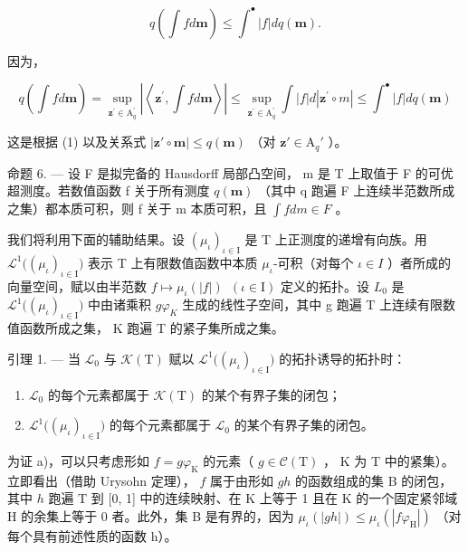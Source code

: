 \[
q \left(\int f d \mathbf {m}\right) \leqslant \int^ {\bullet} | f | d q (\mathbf {m}).
\]

因为，

\[
q \left(\int f d \mathbf {m}\right) = \sup _ {\mathbf {z} ^ {\prime} \in \mathrm{A} _ {q} ^ {\prime}} \left| \left\langle \mathbf {z} ^ {\prime}, \int f d \mathbf {m} \right\rangle \right| \leqslant \sup _ {\mathbf {z} ^ {\prime} \in \mathrm{A} _ {q} ^ {\prime}} \int | f | d | \mathbf {z} ^ {\prime} \circ m | \leqslant \int^ {\bullet} | f | d q (\mathbf {m})
\]

这是根据 (1) 以及关系式 \(|\mathbf{z}' \circ \mathbf{m}| \leqslant q(\mathbf{m})\) （对 \(\mathbf{z}' \in \mathrm{A}_q'\) ）。

命题 6. --- 设 F 是拟完备的 Hausdorff 局部凸空间， m 是 T 上取值于 F 的可优超测度。若数值函数 f 关于所有测度 \(q(\mathbf{m})\) （其中 q 跑遍 F 上连续半范数所成之集）都本质可积，则 f 关于 m 本质可积，且 \(\int f dm \in F\) 。

我们将利用下面的辅助结果。设 \((\mu_{\iota})_{\iota\in\mathrm{I}}\) 是 T 上正测度的递增有向族。用 \(\mathcal{L}^{1}\big((\mu_{\iota})_{\iota\in\mathrm{I}}\big)\) 表示 T 上有限数值函数中本质 \(\mu_{\iota}\)-可积（对每个 \(\iota\in I\) ）者所成的向量空间，赋以由半范数 \(f\mapsto\mu_{\iota}(|f|)\;\ (\iota\in\mathrm{I})\) 定义的拓扑。设 \(L_{0}\) 是 \(\mathcal{L}^{1}\big((\mu_{\iota})_{\iota\in\mathrm{I}}\big)\) 中由诸乘积 \(g\varphi_{K}\) 生成的线性子空间，其中 g 跑遍 T 上连续有限数值函数所成之集， K 跑遍 T 的紧子集所成之集。

引理 1. --- 当 \(\mathcal{L}_0\) 与 \(\mathcal{K}(\mathrm{T})\) 赋以 \(\mathcal{L}^1\big((\mu_\iota)_{\iota \in \mathrm{I}}\big)\) 的拓扑诱导的拓扑时：

\begin{enumerate}
\def\labelenumi{\alph{enumi})}
\item
  \(\mathcal{L}_0\) 的每个元素都属于 \(\mathcal{K}(\mathrm{T})\) 的某个有界子集的闭包；
\item
  \(\mathcal{L}^1\big((\mu_\iota)_{\iota \in \mathrm{I}}\big)\) 的每个元素都属于 \(\mathcal{L}_0\) 的某个有界子集的闭包。
\end{enumerate}

为证 a)，可以只考虑形如 \(f = g\varphi_{\mathrm{K}}\) 的元素（ \(g \in \mathcal{C}(\mathrm{T})\) ， K 为 T 中的紧集）。立即看出（借助 Urysohn 定理）， \(f\) 属于由形如 \(gh\) 的函数组成的集 B 的闭包，其中 \(h\) 跑遍 T 到 {[}0, 1{]} 中的连续映射、在 K 上等于 1 且在 K 的一个固定紧邻域 H 的余集上等于 0 者。此外，集 B 是有界的，因为 \(\mu_{\iota}(|gh|) \leqslant \mu_{\iota}(|f\varphi_{\mathrm{H}}|)\) （对每个具有前述性质的函数 h）。


